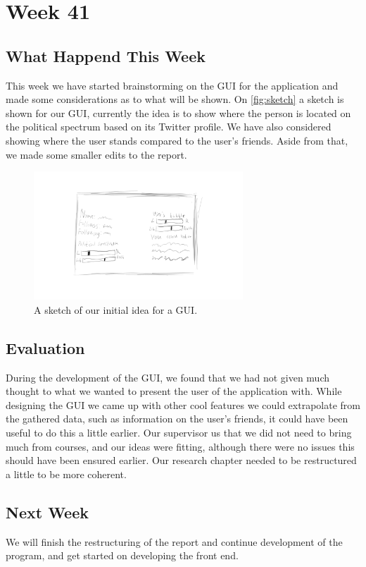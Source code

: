 \section*{Week 41} 
\subsection*{What Happend This Week}
This week we have started brainstorming on the \ac{GUI} for the application and
made some considerations as to what will be shown. On \autoref{fig:sketch} a
sketch is shown for our \ac{GUI}, currently the idea is to show where the person is
located on the political spectrum based on its Twitter profile. We have also
considered showing where the user stands compared to the user's friends. Aside
from that, we made some smaller edits to the report.

\begin{figure}[H] 
	\centering 
	\includegraphics[width = 0.7\textwidth]{figures/guisketch2.png}
	\caption{A sketch of our initial idea for a \ac{GUI}.}
	\label{fig:sketch}
\end{figure}

\subsection*{Evaluation} 
During the development of the \ac{GUI}, we found that
we had not given much thought to what we wanted to present the user of the
application with. While designing the \ac{GUI} we came up with other cool
features we could extrapolate from the gathered data, such as information on the
user's friends, it could have been useful to do this a little earlier. Our
supervisor us that we did not need to bring much from courses, and our ideas
were fitting, although there were no issues this should have been ensured
earlier. Our research chapter needed to be restructured a little to be more
coherent.


\subsection*{Next Week}
We will finish the restructuring of the report and continue development of the
program, and get started on developing the front end.



% 
% 
% 
